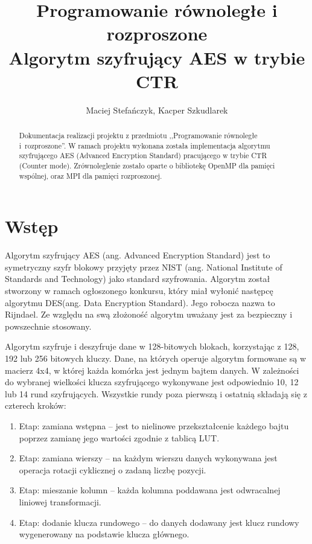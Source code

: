 \documentclass[a4paper,12pt]{article}
\begin{document}
\title{{\small Programowanie równoległe i rozproszone}\\Algorytm szyfrujący AES w trybie CTR}
\author{Maciej Stefańczyk, Kacper Szkudlarek}

\maketitle

\begin{abstract}
Dokumentacja realizacji projektu z przedmiotu ,,Programowanie równoległe i~rozproszone''. W ramach projektu wykonana została implementacja algorytmu szyfrującego AES (Advanced Encryption Standard) pracującego w trybie CTR (Counter mode). Zrównoleglenie zostało oparte o bibliotekę OpenMP dla pamięci wspólnej, oraz MPI dla pamięci rozproszonej.
\end{abstract}


\section{Wstęp}
Algorytm szyfrujący AES (ang. Advanced Encryption Standard) jest to symetryczny szyfr blokowy przyjęty przez NIST (ang. National Institute of Standards and Technology) jako standard szyfrowania. Algorytm został stworzony w ramach ogłoszonego konkursu, który miał wyłonić następcę algorytmu DES(ang. Data Encryption Standard). Jego robocza nazwa to Rijndael. Ze względu na swą złożoność algorytm uważany jest za bezpieczny i powszechnie stosowany.

Algorytm szyfruje i deszyfruje dane w 128-bitowych blokach, korzystając z 128, 192 lub 256 bitowych kluczy. Dane, na których operuje algorytm formowane są w macierz 4x4, w której każda komórka jest jednym bajtem danych. W zależności do wybranej wielkości klucza szyfrującego wykonywane jest odpowiednio 10, 12 lub 14 rund szyfrujących. Wszystkie rundy poza pierwszą i ostatnią składają się z czterech kroków:
\begin{enumerate}
\item Etap: zamiana wstępna -- jest to nielinowe przekształcenie każdego bajtu poprzez zamianę jego wartości zgodnie z tablicą LUT.
\item Etap: zamiana wierszy -- na każdym wierszu danych wykonywana jest operacja rotacji cyklicznej o zadaną liczbę pozycji.
\item Etap: mieszanie kolumn -- każda kolumna poddawana jest odwracalnej liniowej transformacji.
\item Etap: dodanie klucza rundowego -- do danych dodawany jest klucz rundowy wygenerowany na podstawie klucza głównego.
\end{enumerate}
\end{document}
